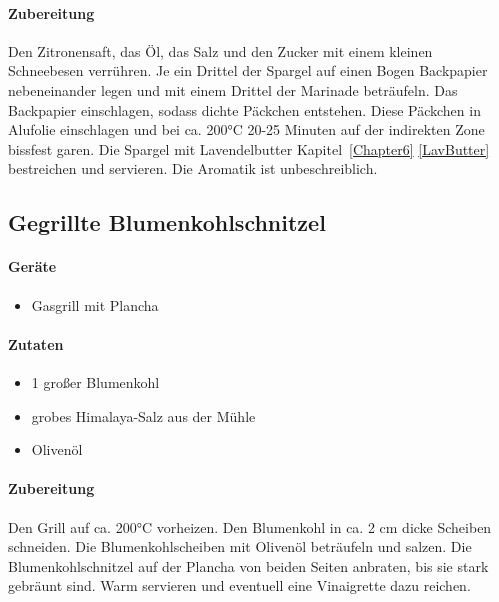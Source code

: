 \paragraph{Zubereitung}
Den Zitronensaft, das Öl, das Salz und den Zucker mit einem kleinen Schneebesen 
verrühren. Je ein Drittel der Spargel auf einen Bogen Backpapier nebeneinander 
legen und mit einem Drittel der Marinade beträufeln. Das Backpapier 
einschlagen, sodass dichte Päckchen entstehen. Diese Päckchen in Alufolie 
einschlagen und bei ca. 200°C 20-25 Minuten auf der indirekten Zone bissfest 
garen. Die Spargel mit Lavendelbutter Kapitel~\ref{Chapter6} \vref{LavButter} 
bestreichen und servieren. Die Aromatik ist unbeschreiblich.

\subsection{Gegrillte Blumenkohlschnitzel}

\paragraph{Geräte}

\begin{itemize}[noitemsep]
	\item Gasgrill mit Plancha
\end{itemize}

\paragraph{Zutaten}

\begin{itemize}[noitemsep]
	\item 1 großer Blumenkohl
	\item grobes Himalaya-Salz aus der Mühle
	\item Olivenöl
\end{itemize}

\paragraph{Zubereitung}

Den Grill auf ca. 200°C vorheizen. Den Blumenkohl in ca. 2 cm dicke 
Scheiben schneiden. Die Blumenkohlscheiben mit Olivenöl beträufeln und 
salzen. Die Blumenkohlschnitzel auf der Plancha von beiden Seiten anbraten, 
bis sie stark gebräunt sind. Warm servieren und eventuell eine Vinaigrette 
dazu reichen.


